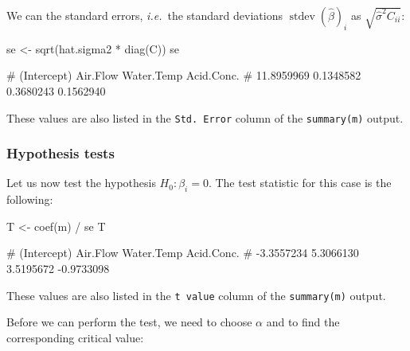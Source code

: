 \documentclass[
  a4paper,
]{article}
\newenvironment{Shaded}{\begin{snugshade}}{\end{snugshade}}
\newcommand{\FunctionTok}[1]{\textcolor[rgb]{0.00,0.00,0.00}{#1}}
\newcommand{\NormalTok}[1]{#1}
\newcommand{\OtherTok}[1]{\textcolor[rgb]{0.56,0.35,0.01}{#1}}
\newcommand{\SpecialCharTok}[1]{\textcolor[rgb]{0.00,0.00,0.00}{#1}}
\theoremstyle{definition}
\theoremstyle{definition}
\theoremstyle{definition}
\theoremstyle{definition}
\theoremstyle{remark}
\begin{document}
We can the standard errors, \emph{i.e.}~the standard deviations
\(\mathop{\mathrm{stdev}}(\hat\beta)_i\) as \(\sqrt{\hat\sigma^2 C_{ii}}\):

\begin{Shaded}
\begin{Highlighting}[]
\NormalTok{se }\OtherTok{\textless{}{-}} \FunctionTok{sqrt}\NormalTok{(hat.sigma2 }\SpecialCharTok{*} \FunctionTok{diag}\NormalTok{(C))}
\NormalTok{se}
\end{Highlighting}
\end{Shaded}

\begin{Shaded}
\begin{Highlighting}[]
\NormalTok{\# (Intercept)    Air.Flow  Water.Temp  Acid.Conc. }
\NormalTok{\#  11.8959969   0.1348582   0.3680243   0.1562940}
\end{Highlighting}
\end{Shaded}

These values are also listed in the \texttt{Std.\ Error} column of the \texttt{summary(m)}
output.

\hypertarget{hypothesis-tests}{%
\subsubsection{Hypothesis tests}\label{hypothesis-tests}}

Let us now test the hypothesis \(H_0\colon \beta_i = 0\). The test statistic
for this case is the following:

\begin{Shaded}
\begin{Highlighting}[]
\NormalTok{T }\OtherTok{\textless{}{-}} \FunctionTok{coef}\NormalTok{(m) }\SpecialCharTok{/}\NormalTok{ se}
\NormalTok{T}
\end{Highlighting}
\end{Shaded}

\begin{Shaded}
\begin{Highlighting}[]
\NormalTok{\# (Intercept)    Air.Flow  Water.Temp  Acid.Conc. }
\NormalTok{\#  {-}3.3557234   5.3066130   3.5195672  {-}0.9733098}
\end{Highlighting}
\end{Shaded}

These values are also listed in the \texttt{t\ value} column of the \texttt{summary(m)}
output.

Before we can perform the test, we need to choose \(\alpha\) and to
find the corresponding critical value:
\end{document}
